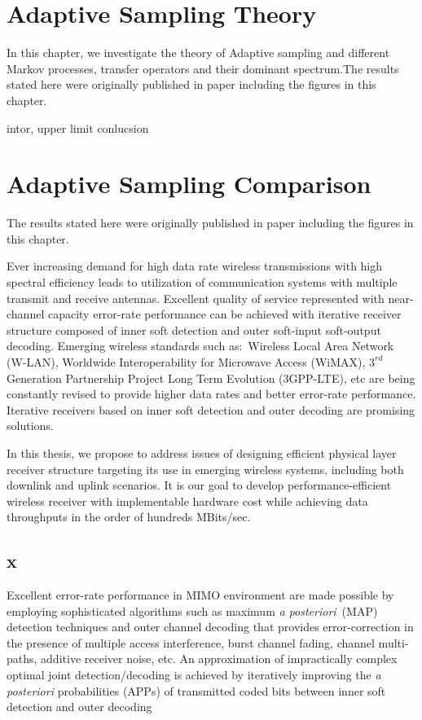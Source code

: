 \chapter{Adaptive Sampling Theory}
\label{ch:chapter3}
In this chapter, we investigate the theory of Adaptive sampling and different Markov processes, transfer operators and their dominant spectrum.The results stated here were originally published in paper \cite{Adstrategies2018} including the figures in this chapter.

intor, upper limit conlucsion


\chapter{Adaptive Sampling Comparison}
\label{ch:chapter32}

The results stated here were originally published in paper\cite{Adstrategies2018} including the figures in this chapter.

Ever increasing demand for high data rate wireless transmissions with high spectral efficiency leads to utilization of communication systems with multiple transmit and receive antennas. Excellent quality of service represented with near-channel capacity error-rate performance can be achieved with iterative receiver structure composed of inner soft detection and outer soft-input soft-output decoding. Emerging wireless standards such as:~Wireless Local Area Network (W-LAN), Worldwide Interoperability for Microwave Access (WiMAX), $3^{rd}$ Generation Partnership Project Long Term Evolution (3GPP-LTE), etc are being constantly revised to provide higher data rates and better error-rate performance. Iterative receivers based on inner soft detection and outer decoding are promising solutions.

In this thesis, we propose to address issues of designing efficient physical layer receiver structure targeting its use in emerging wireless systems, including both downlink and uplink scenarios. It is our goal to develop performance-efficient wireless receiver with implementable hardware cost while achieving data throughputs in the order of hundreds MBits/sec. 

\section{x}
\label{sec:x3}
Excellent error-rate performance in MIMO environment are made possible by employing sophisticated algorithms such as maximum \emph{a posteriori}~(MAP) detection techniques and outer channel decoding that provides error-correction in the presence of multiple access interference, burst channel fading, channel multi-paths, additive receiver noise, etc. An approximation of impractically complex optimal joint detection/decoding is achieved by iteratively improving the \emph{a posteriori} probabilities (APPs) of transmitted coded bits between inner soft detection and outer decoding


